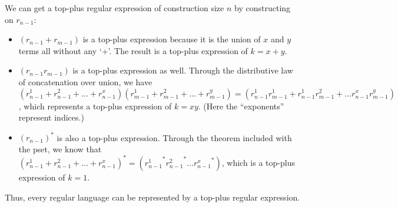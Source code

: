 \begin{enumerate}
  We can get a top-plus regular expression of construction size $n$ by constructing on $r_{n-1}$:
  \begin{itemize}
  \item $(r_{n-1} + r_{m-1})$ is a top-plus expression because it is the union of $x$ and $y$ terms all without any `+'. The result is a top-plus expression of $k=x+y$.
  \item $(r_{n-1}r_{m-1})$ is a top-plus expression as well. Through the distributive law of concatenation over union, we have $(r_{n-1}^1 + r_{n-1}^2 + \ldots + r_{n-1}^x)(r_{m-1}^1 + r_{m-1}^2 + \ldots + r_{m-1}^y) = (r_{n-1}^1r_{m-1}^1 + r_{n-1}^1r_{m-1}^2 + \ldots r_{n-1}^xr_{m-1}^y)$, which represents a top-plus expression of $k=xy$. (Here the ``exponents'' represent indices.)
  \item $(r_{n-1})^*$ is also a top-plus expression. Through the theorem included with the pset, we know that $(r_{n-1}^1+r_{n-1}^2+\ldots+r_{n-1}^x)^* = ({r_{n-1}^1}^{*}{r_{n-1}^2}^{*}\ldots {r_{n-1}^x}^{*})$, which is a top-plus expression of $k=1$.    
  \end{itemize}
  Thus, every regular language can be represented by a top-plus regular expression.  

\end{enumerate}

